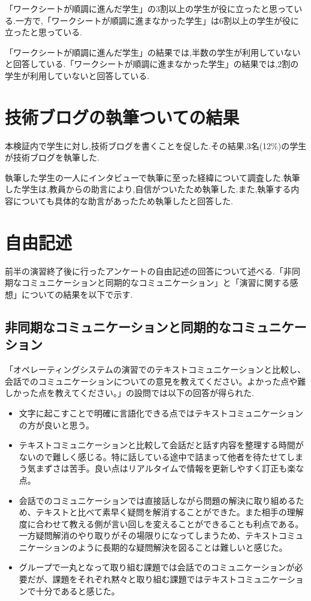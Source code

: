\documentclass[11pt, a4paper]{jreport}
\begin{document}
「ワークシートが順調に進んだ学生」の3割以上の学生が役に立ったと思っている.一方で,「ワークシートが順調に進まなかった学生」は6割以上の学生が役に立ったと思っている. 

「ワークシートが順調に進んだ学生」の結果では,半数の学生が利用していないと回答している.「ワークシートが順調に進まなかった学生」の結果では,2割の学生が利用していないと回答している.

\section{技術ブログの執筆ついての結果}\label{kekka_blog}

本検証内で学生に対し,技術ブログを書くことを促した.その結果,3名(12\%)の学生が技術ブログを執筆した.

執筆した学生の一人にインタビューで執筆に至った経緯について調査した.執筆した学生は,教員からの助言により,自信がついたため執筆した.また,執筆する内容についても具体的な助言があったため執筆したと回答した.

\section{自由記述}

前半の演習終了後に行ったアンケートの自由記述の回答について述べる.「非同期なコミュニケーションと同期的なコミュニケーション」と「演習に関する感想」についての結果を以下で示す.

\subsection{非同期なコミュニケーションと同期的なコミュニケーション}

「オペレーティングシステムの演習でのテキストコミュニケーションと比較し、会話でのコミュニケーションについての意見を教えてください。よかった点や難しかった点を教えてください。」の設問では以下の回答が得られた.

\begin{itemize}
\item 文字に起こすことで明確に言語化できる点ではテキストコミュニケーションの方が良いと思う。
\item テキストコミュニケーションと比較して会話だと話す内容を整理する時間がないので難しく感じる。特に話している途中で詰まって他者を待たせてしまう気まずさは苦手。良い点はリアルタイムで情報を更新しやすく訂正も楽な点。
\item 会話でのコミュニケーションでは直接話しながら問題の解決に取り組めるため、テキストと比べて素早く疑問を解消することができた。また相手の理解度に合わせて教える側が言い回しを変えることができることも利点である。一方疑問解消のやり取りがその場限りになってしまうため、テキストコミュニケーションのように長期的な疑問解決を図ることは難しいと感じた。
\item グループで一丸となって取り組む課題では会話でのコミュニケーションが必要だが、課題をそれぞれ黙々と取り組む課題ではテキストコミュニケーションで十分であると感じた。
\end{itemize}
\end{document}
